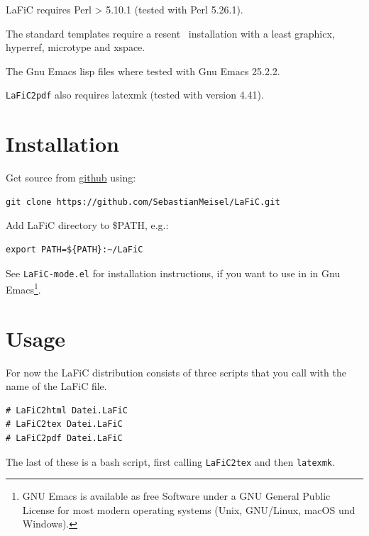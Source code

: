 \documentclass{article}
\begin{document}
{LaFiC requires Perl > 5.10.1 (tested with Perl 5.26.1).\\}

{The standard templates require a resent \XeLaTeX\  installation
with a least graphicx, hyperref, microtype and xspace.\\}

{The Gnu Emacs lisp files where tested with Gnu Emacs 25.2.2.\\}

{\texttt{LaFiC2pdf} also requires latexmk (tested with version 4.41).\\}

\section{Installation}
\label{installation}

{Get source from \href{https://github.com}{github} using:\\}

\begin{verbatim}
git clone https://github.com/SebastianMeisel/LaFiC.git
\end{verbatim}


{Add LaFiC directory to \$PATH, e.g.:\\}

\begin{verbatim}
export PATH=${PATH}:~/LaFiC
\end{verbatim}


{See \texttt{LaFiC-mode.el} for installation instructions, if you want
to use in in Gnu Emacs\footnote{GNU Emacs is available as free Software under a GNU General Public License for most modern operating systems (Unix, GNU/Linux, macOS und Windows).}\xspace .\\}

\section{Usage}

{For now the LaFiC distribution consists of three scripts
that you call with the name of the LaFiC file.\\}

\begin{verbatim}
# LaFiC2html Datei.LaFiC
# LaFiC2tex Datei.LaFiC
# LaFiC2pdf Datei.LaFiC
\end{verbatim}


{The last of these is a bash script, first calling \texttt{LaFiC2tex}
and then \texttt{latexmk}.\\}
\end{document}
